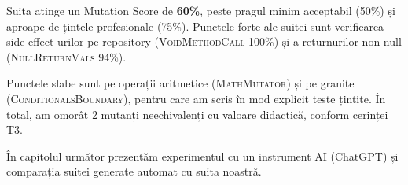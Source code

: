Suita atinge un Mutation Score de \textbf{60\%}, peste pragul minim acceptabil (50\%) și aproape de țintele profesionale (75\%). Punctele forte ale suitei sunt verificarea side-effect-urilor pe repository (\textsc{VoidMethodCall} 100\%) și a returnurilor non-null (\textsc{NullReturnVals} 94\%).

Punctele slabe sunt pe operații aritmetice (\textsc{MathMutator}) și pe granițe (\textsc{ConditionalsBoundary}), pentru care am scris în mod explicit teste țintite. În total, am omorât 2 mutanți neechivalenți cu valoare didactică, conform cerinței T3.

În capitolul următor prezentăm experimentul cu un instrument AI (ChatGPT) și comparația suitei generate automat cu suita noastră.
